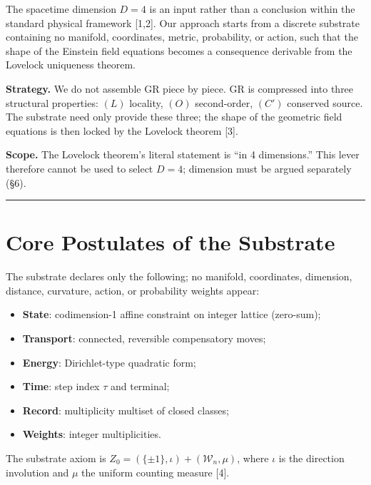 \documentclass[
  11pt,
]{article}
\providecommand{\tightlist}{%
  \setlength{\itemsep}{0pt}\setlength{\parskip}{0pt}}
\begin{document}
The spacetime dimension \(D=4\) is an input rather than a conclusion
within the standard physical framework {[}1,2{]}. Our approach starts
from a discrete substrate containing no manifold, coordinates, metric,
probability, or action, such that the shape of the Einstein field
equations becomes a consequence derivable from the Lovelock uniqueness
theorem.

\textbf{Strategy.} We do not assemble GR piece by piece. GR is
compressed into three structural properties: \((L)\) locality, \((O)\)
second-order, \((C')\) conserved source. The substrate need only provide
these three; the shape of the geometric field equations is then locked
by the Lovelock theorem {[}3{]}.

\textbf{Scope.} The Lovelock theorem's literal statement is ``in 4
dimensions.'' This lever therefore cannot be used to select \(D=4\);
dimension must be argued separately (§6).

\begin{center}\rule{0.5\linewidth}{0.5pt}\end{center}

\section{Core Postulates of the
Substrate}\label{core-postulates-of-the-substrate}

The substrate declares only the following; no manifold, coordinates,
dimension, distance, curvature, action, or probability weights appear:

\begin{itemize}
\tightlist
\item
  \textbf{State}: codimension-1 affine constraint on integer lattice
  (zero-sum);
\item
  \textbf{Transport}: connected, reversible compensatory moves;
\item
  \textbf{Energy}: Dirichlet-type quadratic form;
\item
  \textbf{Time}: step index \(\tau\) and terminal;
\item
  \textbf{Record}: multiplicity multiset of closed classes;
\item
  \textbf{Weights}: integer multiplicities.
\end{itemize}

The substrate axiom is \(Z_0=(\{\pm1\},\iota)+(\mathcal W_n,\mu)\),
where \(\iota\) is the direction involution and \(\mu\) the uniform
counting measure {[}4{]}.
\end{document}
